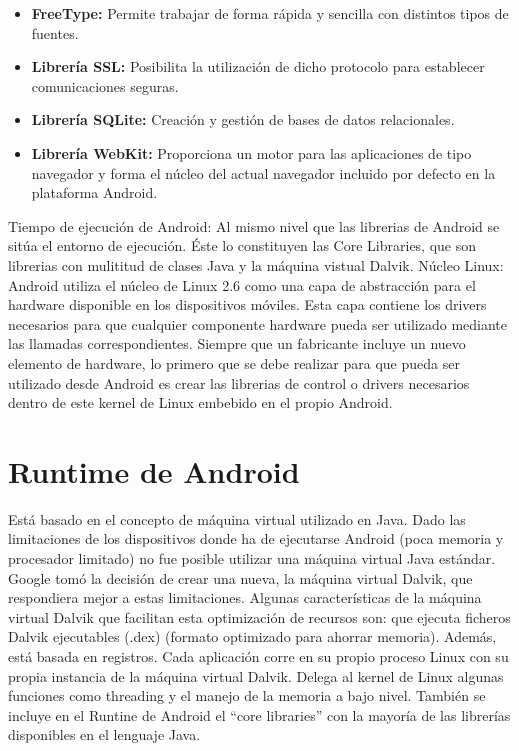 \documentclass[letterpaper,12pt,openany,oneside]{book}
\begin{document}
\begin{itemize}
\begin{itemize}
\item     \textbf      { FreeType:} Permite trabajar de forma rápida  y sencilla con distintos tipos de fuentes.

\item     \textbf        { Librería SSL:} Posibilita la utilización de dicho protocolo para establecer comunicaciones seguras.

\item     \textbf         { Librería SQLite:} Creación y gestión de bases de datos relacionales. 

\item     \textbf     { Librería WebKit:} Proporciona un motor para las aplicaciones de tipo navegador y forma el núcleo del actual navegador incluido por defecto en la plataforma Android.
\end{itemize}
\end{itemize}

Tiempo de ejecución de Android: Al mismo nivel que las librerias de Android se sitúa el entorno de ejecución. Éste lo constituyen las Core Libraries, que son librerias con mulititud de clases Java y la máquina vistual Dalvik.
Núcleo Linux: Android utiliza el núcleo de Linux 2.6 como una capa de abstracción para el hardware disponible en los dispositivos móviles. Esta capa contiene los drivers necesarios para que cualquier componente hardware pueda ser utilizado mediante las llamadas correspondientes. Siempre que un fabricante incluye un nuevo elemento de hardware, lo primero que se debe realizar para que pueda ser utilizado desde Android es crear las librerias de control o drivers necesarios dentro de este kernel de Linux embebido en el propio Android.

\section{Runtime de Android}
Está basado en el concepto de máquina virtual utilizado en Java. Dado las
limitaciones de los dispositivos donde ha de ejecutarse Android (poca memoria y
procesador limitado) no fue posible utilizar una máquina virtual Java estándar.
Google tomó la decisión de crear una nueva, la máquina virtual Dalvik, que
respondiera mejor a estas limitaciones.
Algunas características de la máquina virtual Dalvik que facilitan esta
optimización de recursos son: que ejecuta ficheros Dalvik ejecutables (.dex) (formato
optimizado para ahorrar memoria). Además, está basada en registros. Cada
aplicación corre en su propio proceso Linux con su propia instancia de la máquina
virtual Dalvik. Delega al kernel de Linux algunas funciones como threading y el
manejo de la memoria a bajo nivel.
También se incluye en el Runtine de Android el “core libraries” con la mayoría
de las librerías disponibles en el lenguaje Java.
\end{document}
